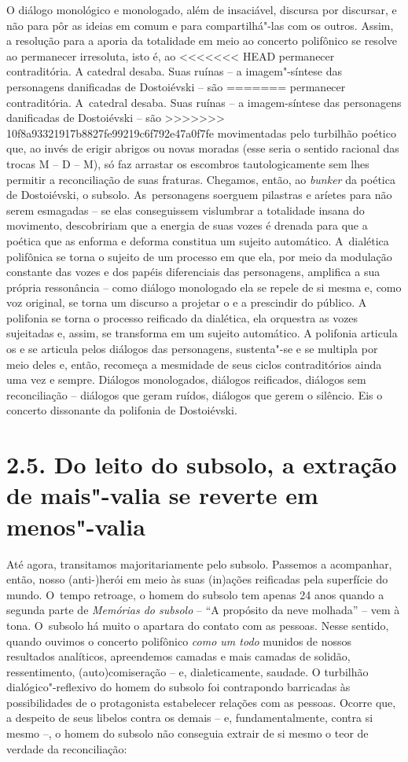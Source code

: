 {O diálogo monológico e monologado, além de insaciável, discursa por
discursar, e não para pôr as ideias em comum e para compartilhá"-las com
os outros. Assim, a resolução para a aporia da totalidade em meio ao
concerto polifônico se resolve ao permanecer irresoluta, isto é, ao
<<<<<<< HEAD
permanecer contraditória. A catedral desaba. Suas ruínas -- a
imagem"-síntese das personagens danificadas de Dostoiévski -- são
=======
permanecer contraditória. A~catedral desaba. Suas ruínas -- a
imagem-síntese das personagens danificadas de Dostoiévski -- são
>>>>>>> 10f8a93321917b8827fe99219c6f792e47a0f7fe
movimentadas pelo turbilhão poético que, ao invés de erigir abrigos ou
novas moradas (esse seria o sentido racional das trocas M -- D -- M), só
faz arrastar os escombros tautologicamente sem lhes permitir a
reconciliação de suas fraturas. Chegamos, então, ao \emph{bunker} da
poética de Dostoiévski, o subsolo. As~personagens soerguem pilastras e
aríetes para não serem esmagadas -- se elas conseguissem vislumbrar a
totalidade insana do movimento, descobririam que a energia de suas vozes
é drenada para que a poética que as enforma e deforma constitua um
sujeito automático. A~dialética polifônica se torna o sujeito de um
processo em que ela, por meio da modulação constante das vozes e dos
papéis diferenciais das personagens, amplifica a sua própria ressonância
-- como diálogo monologado ela se repele de si mesma e, como voz
original, se torna um discurso a projetar o e a prescindir do público. A
polifonia se torna o processo reificado da dialética, ela orquestra as
vozes sujeitadas e, assim, se transforma em um sujeito automático. A
polifonia articula os e se articula pelos diálogos das personagens,
sustenta"-se e se multipla por meio deles e, então, recomeça a mesmidade
de seus ciclos contraditórios ainda uma vez e sempre. Diálogos
monologados, diálogos reificados, diálogos sem reconciliação -- diálogos
que geram ruídos, diálogos que gerem o silêncio. Eis o concerto
dissonante da polifonia de Dostoiévski.

\section{2.5. Do leito do subsolo, a extração de mais"-valia se reverte em
menos"-valia}

Até agora, transitamos majoritariamente pelo subsolo. Passemos a
acompanhar, então, nosso (anti-)herói em meio às suas (in)ações
reificadas pela superfície do mundo. O~tempo retroage, o homem do
subsolo tem apenas 24 anos quando a segunda parte de \emph{Memórias do
subsolo} -- ``A propósito da neve molhada'' -- vem à tona. O~subsolo há
muito o apartara do contato com as pessoas. Nesse sentido, quando
ouvimos o concerto polifônico \emph{como um todo} munidos de nossos
resultados analíticos, apreendemos camadas e mais camadas de solidão,
ressentimento, (auto)comiseração -- e, dialeticamente, saudade. O
turbilhão dialógico"-reflexivo do homem do subsolo foi contrapondo
barricadas às possibilidades de o protagonista estabelecer relações com
as pessoas. Ocorre que, a despeito de seus libelos contra os demais --
e, fundamentalmente, contra si mesmo --, o homem do subsolo não
conseguia extrair de si mesmo o teor de verdade da reconciliação:

}
